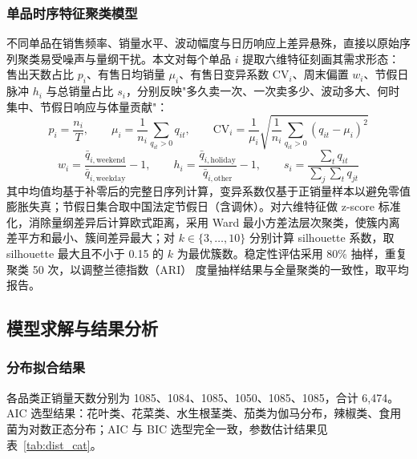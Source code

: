 \subsubsection{单品时序特征聚类模型}

不同单品在销售频率、销量水平、波动幅度与日历响应上差异悬殊，直接以原始序列聚类易受噪声与量纲干扰。本文对每个单品 $i$ 提取六维特征刻画其需求形态\cite{wang2006}：售出天数占比 $p_i$、有售日均销量 $\mu_i$、有售日变异系数 $\mathrm{CV}_i$、周末偏置 $w_i$、节假日脉冲 $h_i$ 与总销量占比 $s_i$，分别反映"多久卖一次、一次卖多少、波动多大、何时集中、节假日响应与体量贡献"：
\begin{equation}\label{eq:feat1}
  p_i=\frac{n_i}{T},\qquad
  \mu_i=\frac{1}{n_i}\sum_{q_{it}>0}q_{it},\qquad
  \mathrm{CV}_i=\frac{1}{\mu_i}\sqrt{\frac{1}{n_i}\sum_{q_{it}>0}(q_{it}-\mu_i)^2}
\end{equation}
\begin{equation}\label{eq:feat2}
  w_i=\frac{\bar q_{i,\mathrm{weekend}}}{\bar q_{i,\mathrm{weekday}}}-1,\qquad
  h_i=\frac{\bar q_{i,\mathrm{holiday}}}{\bar q_{i,\mathrm{other}}}-1,\qquad
  s_i=\frac{\sum_t q_{it}}{\sum_j\sum_t q_{jt}}
\end{equation}
其中均值均基于补零后的完整日序列计算，变异系数仅基于正销量样本以避免零值膨胀失真；节假日集合取中国法定节假日（含调休）。对六维特征做 z-score 标准化，消除量纲差异后计算欧式距离，采用 Ward 最小方差法层次聚类\cite{ward1963,murtagh2014}，使簇内离差平方和最小、簇间差异最大；对 $k\in\{3,\dots,10\}$ 分别计算 silhouette 系数\cite{rouseeuw1987}，取 silhouette 最大且不小于 0.15 的 $k$ 为最优簇数。稳定性评估采用 80\% 抽样，重复聚类 50 次，以调整兰德指数（ARI）\cite{hubert1985} 度量抽样结果与全量聚类的一致性，取平均报告。

\subsection{模型求解与结果分析}

\subsubsection{分布拟合结果}

各品类正销量天数分别为 1085、1084、1085、1050、1085、1085，合计 6,474。AIC 选型结果：花叶类、花菜类、水生根茎类、茄类为伽马分布，辣椒类、食用菌为对数正态分布；AIC 与 BIC 选型完全一致，参数估计结果见表~\ref{tab:dist_cat}。

